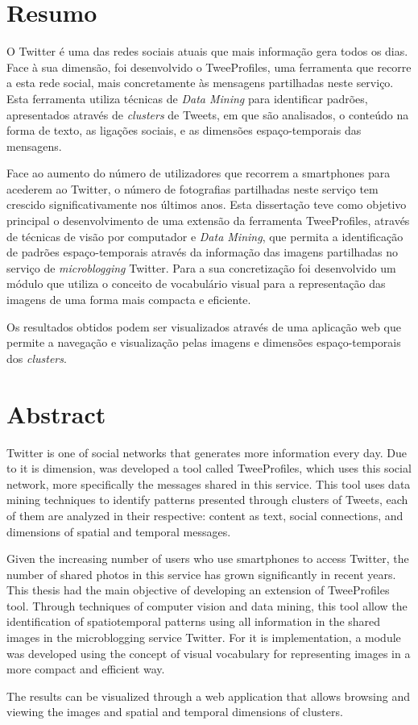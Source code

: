 \chapter*{Resumo}

O Twitter é uma das redes sociais atuais que mais informação gera todos os dias. Face à sua dimensão, foi desenvolvido o TweeProfiles, uma ferramenta que recorre a esta rede social, mais concretamente às mensagens partilhadas neste serviço. Esta ferramenta utiliza técnicas de \textit{Data Mining} para identificar padrões, apresentados através de \textit{clusters} de Tweets, em que são analisados, o conteúdo na forma de texto, as ligações sociais, e as dimensões espaço-temporais das mensagens.

Face ao aumento do número de utilizadores que recorrem a smartphones para acederem ao Twitter, o número de fotografias partilhadas neste serviço tem crescido significativamente nos últimos anos. Esta dissertação teve como objetivo principal o desenvolvimento de uma extensão da ferramenta TweeProfiles, através de técnicas de visão por computador e \textit{Data Mining}, que permita a identificação de padrões espaço-temporais através da informação das imagens partilhadas no serviço de \textit{microblogging} Twitter. Para a sua concretização foi desenvolvido um módulo que utiliza o conceito de vocabulário visual para a representação das imagens de uma forma mais compacta e eficiente. 


Os resultados obtidos podem ser visualizados através de uma aplicação web que permite a navegação e visualização pelas imagens e dimensões espaço-temporais dos \textit{clusters}.

\chapter*{Abstract}

Twitter is one of social networks that generates more information every day. Due to it is dimension, was developed a tool called TweeProfiles, which uses this social network, more specifically the messages shared in this service. This tool uses data mining techniques to identify patterns presented through clusters of Tweets, each of them are analyzed in their respective: content as text, social connections, and dimensions of spatial and temporal messages.

Given the increasing number of users who use smartphones to access Twitter, the number of shared photos in this service has grown significantly in recent years. This thesis had the main objective of developing an extension of TweeProfiles tool. Through techniques of computer vision and data mining, this tool allow the identification of spatiotemporal patterns using all information in the shared images in the microblogging service Twitter. For it is implementation, a module was developed using the concept of visual vocabulary for representing images in a more compact and efficient way.

The results can be visualized through a web application that allows browsing and viewing the images and spatial and temporal dimensions of clusters. 

